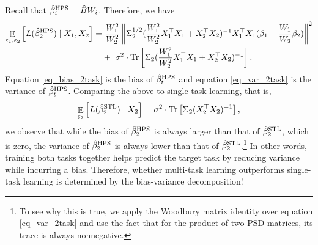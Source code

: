 \cor
Recall that $\hat{\beta}_i^{\textup{HPS}} = \hat{B} W_i$. Therefore, we have
\begin{align}
	\mathop{\mathbb{E}}_{\varepsilon_1, \varepsilon_2}\left[ L(\hat{\beta}_2^{\textup{HPS}}) \mid X_1, X_2 \right]
	=&~ \frac{W_1^2}{W_2^2} \left\| \Sigma_2^{1/2}(\frac{W_1^2}{W_2^2} X_1^{\top}X_1 + X_2^{\top}X_2)^{-1} X_1^{\top}X_1 (\beta_1 - \frac{W_1}{W_2} \beta_2) \right\|^2 \label{eq_bias_2task} \\
			&+~  \sigma^2\cdot \operatorname{Tr}\left[\Sigma_2(\frac{W_1^2}{W_2^2} X_1^{\top}X_1 + X_2^{\top}X_2)^{-1} \right]. \label{eq_var_2task}
\end{align}
Equation \eqref{eq_bias_2task} is the bias of $\hat{\beta}_t^{\textup{HPS}}$ and
equation \eqref{eq_var_2task} is the variance of $\hat{\beta}_t^{\textup{HPS}}$.
Comparing the above to single-task learning, that is,
\begin{align}
	\mathop{\mathbb{E}}_{\varepsilon_2}\left[ L(\hat{\beta}_2^{\textup{STL}}) \mid X_2 \right] = \sigma^2 \cdot \operatorname{Tr}\left[\Sigma_2 (X_2^{\top} X_2)^{-1}\right], \label{eq_var_stl}
\end{align}
we observe that while the bias of $\hat{\beta}_2^{\textup{HPS}}$ is always larger than that of $\hat{\beta}_2^{\textup{STL}}$, which is zero, the variance of $\hat{\beta}_2^{\textup{HPS}}$ is always lower than that of $\hat{\beta}_2^{\textup{STL}}$.\footnote{To see why this is true, we apply the Woodbury matrix identity over equation \eqref{eq_var_2task} and use the fact that for the product of two PSD matrices, its trace is always nonnegative.}
In other words, training both tasks together helps predict the target task by reducing variance while incurring a bias.
Therefore, whether multi-task learning outperforms single-task learning is determined by the bias-variance decomposition!

